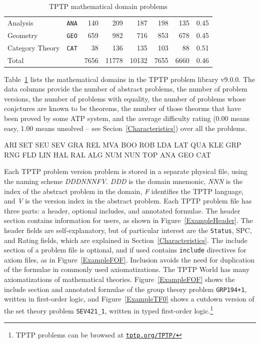 \documentclass[runningheads]{llncs}
\begin{document}
\begin{table}[tb]
\begin{center}
\begin{tabular}{lr|rr|rrrr}
Analysis            & {\tt ANA} &  140 &  209 &  187 &  198 &  135 & 0.45 \\
Geometry            & {\tt GEO} &  659 &  982 &  716 &  853 &  678 & 0.45 \\
Category Theory     & {\tt CAT} &   38 &  136 &  135 &  103 &   88 & 0.51 \\
\hline
Total               &           & 7656 &11778 &10132 & 7655 & 6660 & 0.46 \\
\end{tabular}
\end{center}
\caption{TPTP mathematical domain problems}
\label{Domains}
\end{table}

Table~\ref{Domains} lists the mathematical domains in the TPTP problem library v9.0.0.
The data columns provide the number of abstract problems, the number of problem versions, the
number of problems with equality, the number of problems whose conjctures are known to be
theorems, the number of those theorms that have been proved by some ATP system, and the average 
difficulty rating (0.00 means easy, 1.00 means unsolved -- see Secion~\ref{Characteristics}) over 
all the problems.

ARI SET SEU SEV GRA REL MVA BOO ROB LDA LAT QUA KLE GRP RNG FLD LIN HAL RAL ALG NUM NUN TOP ANA GEO CAT

Each TPTP problem version problem is stored in a separate physical file, using the naming scheme 
{\em DDDNNNFV}.
{\em DDD} is the domain mnemonic, {\em NNN} is the index of the abstract problem in the domain,
{\em F} identifies the TPTP language, and {\em V} is the version index in the abstract problem.
Each TPTP problem file has three parts: a header, optional includes, and annotated formulae.
The header section contains information for users, as shown in Figure~\ref{ExampleHeader}.
The header fields are self-explanatory, but of particular interest are the {\tt Status}, SPC,
and Rating fields, which are explained in Section~\ref{Characteristics}.
The include section of a problem file is optional, and if used contains {\tt include} directives 
for axiom files, as in Figure~\ref{ExampleFOF}.
Inclusion avoids the need for duplication of the formulae in commonly used axiomatizations.
The TPTP World has many axiomatizations of mathematical theories.
Figure~\ref{ExampleFOF} shows the include section and annotated formulae of the group theory 
problem {\tt GRP194+1}, written in first-order logic, and Figure~\ref{ExampleTF0} shows a cutdown 
version of the set theory problem {\tt SEV421\_1}, written in typed first-order logic.\footnote{%
TPTP problems can be browsed at \href{https://tptp.org/TPTP/}{{\tt tptp.org/TPTP/}}}
\end{document}
